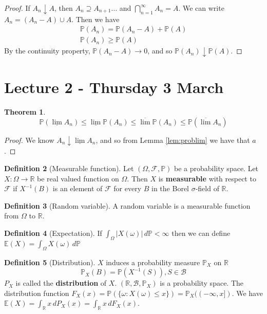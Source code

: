 \documentclass[10pt, oneside, reqno]{amsart}
\theoremstyle{plain}%
\newtheorem{thm}{Theorem}[section]
\theoremstyle{definition}
\newtheorem{defn}[thm]{Definition}
\theoremstyle{remark}
\newcommand{\sigf}{\mathcal{F}}
\newcommand{\R}{\mathbb{R}}
\newcommand{\E}{\mathbb{E}}
\renewcommand{\P}{\mathbb{P}}
\begin{document}
\begin{proof}
    If $A_n \downarrow A$, then $A_n \supseteq A_{n+1} \dots$ and $\bigcap_{n=1}^\infty A_n = A$.  We can write $A_n = (A_n - A) \cup A$.  Then we have 
    \begin{align*}
        \P(A_n) = \P(A_n - A) + \P(A) \\
        \P(A_n) \geq \P(A)
    \end{align*}
    By the continuity property, $\P(A_n - A) \rightarrow 0$, and so $\P(A_n) \downarrow \P(A)$.
\end{proof}


\section{Lecture 2 - Thursday 3 March} %
\label{sec:lecture_2_thursday_3_march}
\begin{thm}
    \[
        \P( \underline{\lim} A_n ) \leq \underline{\lim} \P(A_n) \leq \overline{\lim} \P(A_n) \leq \P( \overline{\lim} A_n )    
    \]
\end{thm}
\begin{proof}
    We know $A_n \downarrow \underline{\lim} A_n$, and so from Lemma \ref{lem:problim} we have that $a$.
\end{proof}

\begin{defn}[Measurable function]
    Let $(\Omega, \sigf, \P)$ be a probability space.  Let $X : \Omega \rightarrow \R$ be real valued function on $\Omega$.  Then $X$ is \textbf{measurable} with respect to $\sigf$ if $X^{-1}(B)$ is an element of $\sigf$ for every $B$ in the Borel $\sigma$-field of $\R$. 
\end{defn}

\begin{defn}[Random variable]
    A random variable is a measurable function from $\Omega$ to $\R$.  
\end{defn}

\begin{defn}[Expectation]
    If $\int_\Omega | X(\omega) | \, d\P < \infty$ then we can define $\E(X) = \int_\Omega X(\omega) \, d \P$
\end{defn}

\begin{defn}[Distribution]
    $X$ induces a probability measure $\P_X$ on $\R$\[
        \P_X(B) = \P(X^{-1}(S)), S \in \mathcal{B}
    \]
    $P_X$ is called the \textbf{distribution} of $X$.  $(\R, \mathcal{B}, \P_X)$ is a probability space.
    The distribution function $F_X(x) = \P( \{ \omega : X(\omega) \leq x \} ) = \P_X( (-\infty, x] )$.  
    We have $\E(X) = \int_\R x \, dP_X(x) = \int_\R x \, dF_X(x)$.
\end{defn}
\end{document}
